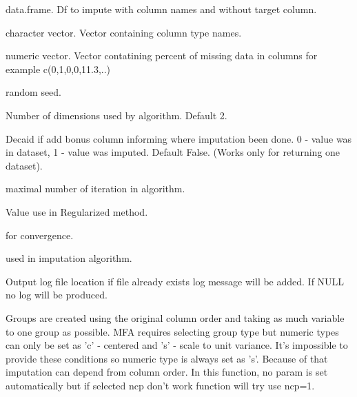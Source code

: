 \documentclass[letterpaper]{book}
\begin{document}
%
\begin{Arguments}
\begin{ldescription}
\item[\code{df}] data.frame. Df to impute with column names and without target column.

\item[\code{col\_type}] character vector. Vector containing column type names.

\item[\code{percent\_of\_missing}] numeric vector. Vector contatining percent of missing data in columns for example  c(0,1,0,0,11.3,..)

\item[\code{random.seed}] random seed.

\item[\code{ncp}] Number of dimensions used by algorithm. Default 2.

\item[\code{col\_0\_1}] Decaid if add bonus column informing where imputation been done. 0 - value was in dataset, 1 - value was imputed. Default False. (Works only for returning one dataset).

\item[\code{maxiter}] maximal number of iteration in algorithm.

\item[\code{coeff.ridge}] Value use in Regularized method.

\item[\code{threshold}] for convergence.

\item[\code{method}] used in imputation algorithm.

\item[\code{out\_file}] Output log file location if file already exists log message will be added. If NULL no log will be produced.
\end{ldescription}
\end{Arguments}
%
\begin{Details}\relax
Groups are created using the original column order and taking as much variable to one group as possible. MFA requires selecting group type but numeric types can only be set as 'c' - centered and 's' - scale to unit variance.
It's impossible to provide these conditions so numeric type is always set as 's'.  Because of that imputation can depend from column order. In this function, no param is set automatically but if selected ncp don't work function will try use ncp=1.
\end{Details}
\end{document}
